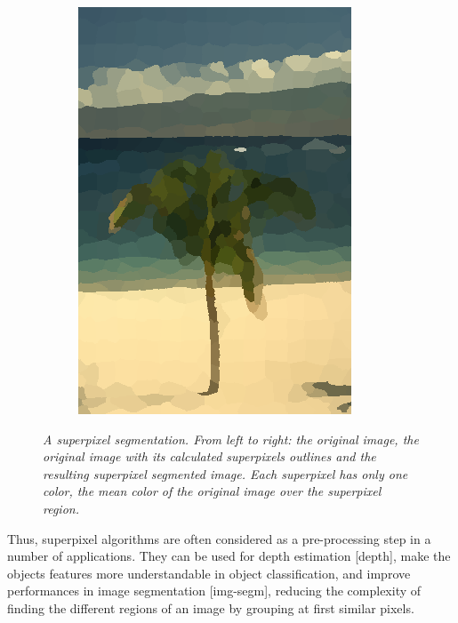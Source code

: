 \documentclass{article}
\begin{document}
\begin{figure}[!ht]
\begin{subfigure}{.3\linewidth}
            \includegraphics[width=0.9\linewidth]{pics/img_spp3.png}
        \end{subfigure}
            \caption{\textit{A superpixel segmentation. From left to right: the original image, the original image with its calculated superpixels outlines and the resulting superpixel segmented image. Each superpixel has only one color, the mean color of the original image over the superpixel region.}}
            \label{fig:spp}
        \end{figure}

        Thus, superpixel algorithms are often considered as a pre-processing step in a number of applications. They can be used for depth estimation [depth], make the objects features more understandable in object classification, and improve performances in image segmentation [img-segm], reducing the complexity of finding the different regions of an image by grouping at first similar pixels.
\end{document}
